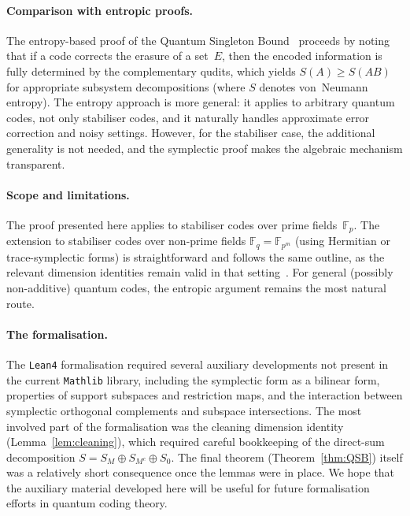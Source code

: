 \documentclass[11pt]{article}
\theoremstyle{plain}
\theoremstyle{definition}
\newcommand{\F}{\mathbb{F}}
\begin{document}
\paragraph{Comparison with entropic proofs.}
The entropy-based proof of the Quantum Singleton
Bound~\cite{NielsenChuang,GrasslHuberWinter2022} proceeds by noting that if a code corrects
the erasure of a set~$E$, then the encoded information is fully determined by the
complementary qudits, which yields $S(A) \ge S(AB)$ for appropriate subsystem decompositions
(where $S$ denotes von~Neumann entropy).  The entropy approach is more general: it applies to
arbitrary quantum codes, not only stabiliser codes, and it naturally handles approximate error
correction and noisy settings.  However, for the stabiliser case, the additional generality is
not needed, and the symplectic proof makes the algebraic mechanism transparent.

\paragraph{Scope and limitations.}
The proof presented here applies to stabiliser codes over prime fields~$\F_p$.  The extension
to stabiliser codes over non-prime fields $\F_q = \F_{p^m}$ (using Hermitian or
trace-symplectic forms) is straightforward and follows the same outline, as the relevant
dimension identities remain valid in that
setting~\cite{KetkarKlappeneckerKumarSarvepalli2006,Ashikhmin2001}.  For general (possibly
non-additive) quantum codes, the entropic argument remains the most natural route.

\paragraph{The formalisation.}
The \texttt{Lean4} formalisation required several auxiliary developments not present in the
current \texttt{Mathlib} library, including the symplectic form as a bilinear form, properties
of support subspaces and restriction maps, and the interaction between symplectic orthogonal
complements and subspace intersections.  The most involved part of the formalisation was the
cleaning dimension identity (Lemma~\ref{lem:cleaning}), which required careful bookkeeping of
the direct-sum decomposition $S = S_M \oplus S_{M^c} \oplus S_0$.  The final theorem
(Theorem~\ref{thm:QSB}) itself was a relatively short consequence once the lemmas were in
place.  We hope that the auxiliary material developed here will be useful for future
formalisation efforts in quantum coding theory.
\end{document}
